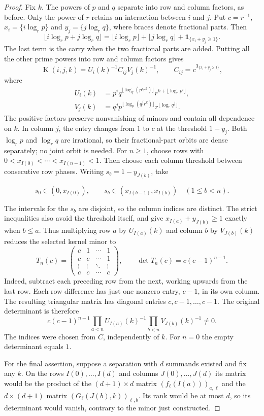 \documentclass[11pt]{article}
\newcommand{\Kernel}{\operatorname{K}}
\begin{document}
\begin{proof}
Fix $k$. The powers of $p$ and $q$ separate into row and column factors,
as before. Only the power of $r$ retains an interaction between $i$ and $j$. Put $c=r^{-1}$, $x_i=\{i\log_r p\}$ and
$y_j=\{j\log_r q\}$, where braces denote fractional parts. Then
\[
 \lfloor i\log_r p+j\log_r q\rfloor
 =\lfloor i\log_r p\rfloor+\lfloor j\log_r q\rfloor
   +\mathbf1_{\{x_i+y_j\ge1\}}.
\]
The last term is the carry when the two fractional parts are added.
Putting all the other prime powers into row and column factors gives
\[
 \Kernel(i,j,k)=U_i(k)^{-1}C_{ij}V_j(k)^{-1},\qquad
 C_{ij}=c^{\mathbf1_{\{x_i+y_j\ge1\}}},
\]
where
\[
\begin{aligned}
 U_i(k)&=p^i q^{\lfloor\log_q(p^ir^k)\rfloor}
            r^{k+\lfloor\log_r p^i\rfloor},\\
 V_j(k)&=q^j p^{\lfloor\log_p(q^jr^k)\rfloor}
            r^{\lfloor\log_r q^j\rfloor}.
\end{aligned}
\]
The positive factors preserve nonvanishing of minors and contain all
dependence on $k$. In column $j$, the entry changes from $1$ to $c$
at the threshold $1-y_j$. Both $\log_r p$ and $\log_r q$ are irrational,
so their fractional-part orbits are dense separately; no joint orbit
is needed. For $n\ge1$, choose rows with
$0<x_{I(0)}<\cdots<x_{I(n-1)}<1$. Then choose each column threshold
between consecutive row phases. Writing $s_b=1-y_{J(b)}$, take

\[
 s_0\in(0,x_{I(0)}),\qquad
 s_b\in(x_{I(b-1)},x_{I(b)})\quad(1\le b<n).
\]

The intervals for the $s_b$ are disjoint, so the column indices are
distinct.  The strict inequalities also avoid the threshold itself, and give
$x_{I(a)}+y_{J(b)}\ge1$ exactly when $b\le a$.  Thus multiplying row $a$
by $U_{I(a)}(k)$ and column $b$ by $V_{J(b)}(k)$ reduces the selected kernel
minor to
\[
 T_n(c)=\begin{pmatrix}
 c&1&\cdots&1\\
 c&c&\cdots&1\\
 \vdots&\vdots&\ddots&\vdots\\
 c&c&\cdots&c
 \end{pmatrix},\qquad
 \det T_n(c)=c(c-1)^{n-1}.
\]
Indeed, subtract each preceding row from the next, working upwards from
the last row. Each row difference has just one nonzero entry, $c-1$, in
its own column. The resulting triangular matrix has diagonal entries
$c,c-1,\ldots,c-1$.
The original determinant is therefore
\[
 c(c-1)^{n-1}
 \prod_{a<n}U_{I(a)}(k)^{-1}\prod_{b<n}V_{J(b)}(k)^{-1}\ne0.
\]
The indices were chosen from $C$, independently of $k$.  For $n=0$ the
empty determinant equals $1$.

For the final assertion, suppose a separation with $d$ summands existed and
fix any $k$.  On the rows $I(0),\ldots,I(d)$ and columns
$J(0),\ldots,J(d)$ its matrix would be the product of the $(d+1)\times d$
matrix $(f_\ell(I(a)))_{a,\ell}$ and the $d\times(d+1)$ matrix
$(G_\ell(J(b),k))_{\ell,b}$.  Its rank would be at most $d$, so its
determinant would vanish, contrary to the minor just constructed.
\end{proof}
\end{document}
